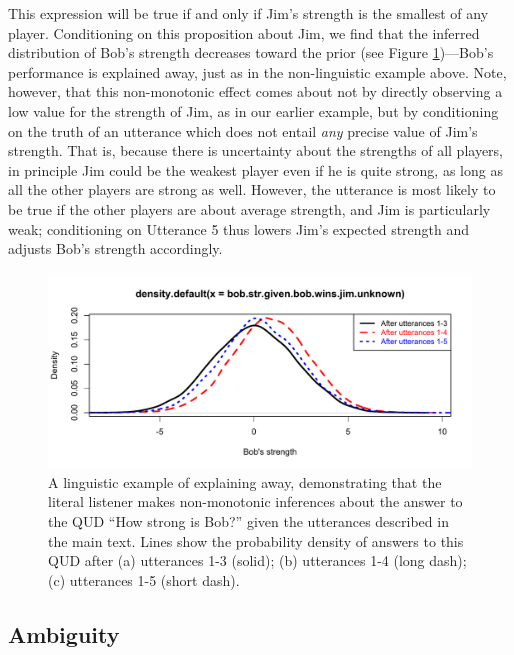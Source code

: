 \documentclass[pdfextras]{handbook}
\begin{document}
This expression will be true if and only if Jim's strength is the smallest of any player.
Conditioning on this proposition about Jim, we find that the inferred distribution of Bob's strength decreases toward the prior (see Figure \ref{explawayutt})---Bob's performance is explained away, just as in the non-linguistic example above. 
Note, however, that this non-monotonic effect comes about not by directly observing a low value for the strength of Jim, as in our earlier example, but by conditioning on the truth of an utterance which does not entail \emph{any} precise value of Jim's strength. 
That is, because there is uncertainty about the strengths of all players, in principle Jim could be the weakest player even if he is quite strong, as long as all the other players are strong as well. 
However, the utterance is most likely to be true if the other players are about average strength, and Jim is particularly weak; conditioning on Utterance 5 thus lowers Jim's expected strength and adjusts Bob's strength accordingly.

\begin{figure}[tbh]
\begin{center}
\includegraphics[scale=.55]{explaining-away-ling.pdf}
\end{center}
\caption{A linguistic example of explaining away, demonstrating that the literal listener makes non-monotonic inferences about the answer to the QUD ``How strong is Bob?'' given the utterances described in the main text. 
Lines show the probability density of answers to this QUD after (a) utterances 1-3 (solid); (b) utterances 1-4 (long dash); (c) utterances 1-5 (short dash).}
\label{explawayutt}
\end{figure}


\subsection{Ambiguity}
\label{ambiguity}
\end{document}
